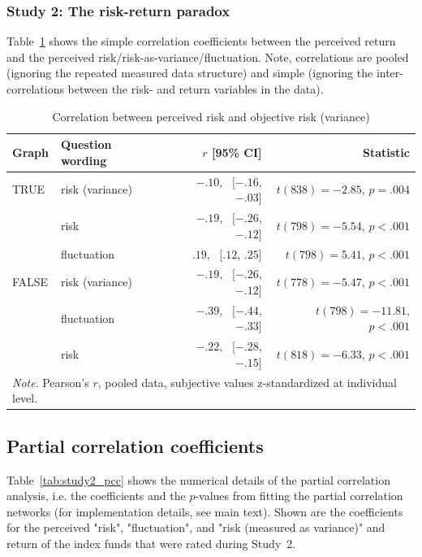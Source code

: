\subsubsection{Study 2: The risk-return paradox}
Table~\ref{tab:study2_rr} shows the simple correlation coefficients between the perceived return and the perceived risk/risk-as-variance/fluctuation. Note, correlations are pooled (ignoring the repeated measured data structure) and simple (ignoring the inter-correlations between the risk- and return variables in the data).
\begin{table}[h!t]
\centering
\caption{Correlation between perceived risk and objective risk (variance)}
\label{tab:study2_rr}
\begin{tabular}{llrr}
 Graph & Question wording & $r$ [95\% CI] & Statistic \\ 
  \midrule
TRUE & risk (variance) & $-.10$, \  $[-.16$, $-.03]$ & $t(838) = -2.85$, $p = .004$ \\ 
   & risk & $-.19$, \  $[-.26$, $-.12]$ & $t(798) = -5.54$, $p < .001$ \\ 
   & fluctuation & $.19$, \  $[.12$, $.25]$ & $t(798) = 5.41$, $p < .001$ \\ 
   \midrule
FALSE & risk (variance) & $-.19$, \  $[-.26$, $-.12]$ & $t(778) = -5.47$, $p < .001$ \\ 
   & fluctuation & $-.39$, \  $[-.44$, $-.33]$ & $t(798) = -11.81$, $p < .001$ \\ 
   & risk & $-.22$, \  $[-.28$, $-.15]$ & $t(818) = -6.33$, $p < .001$ \\ 
   \bottomrule
\multicolumn{4}{l}{{\textit{Note}. Pearson's $r$, pooled data, subjective values z-standardized at individual level.}}
\end{tabular}
\end{table}







\newpage
\subsection{Partial correlation coefficients}
Table~\ref{tab:study2_pcc} shows the numerical details of the partial correlation analysis, i.e. the coefficients and the $p$-values from fitting the partial correlation networks (for implementation details, see main text). Shown are the coefficients for the perceived "risk", "fluctuation", and  "risk (measured as variance)" and return of the index funds that were rated during Study~2.


